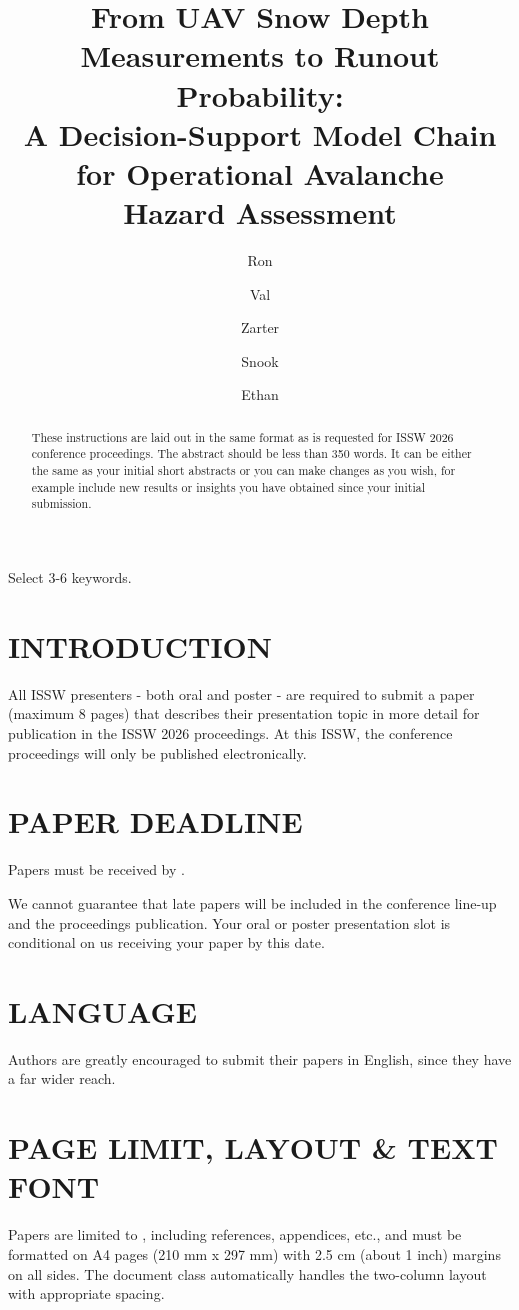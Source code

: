 \documentclass{issw}
\title{From UAV Snow Depth Measurements to Runout Probability: \\A Decision-Support Model Chain for Operational Avalanche \\Hazard Assessment}
\author[1]{Ron\corref{complete\_address}}
\author[1]{Val}
\author[1]{Zarter}
\author[1]{Snook}
\author[1]{Ethan}
\begin{document}
\begin{abstract}
These instructions are laid out in the same format as is requested for ISSW 2026 conference proceedings. The abstract should be less than 350 words. It can be either the same as your initial short abstracts or you can make changes as you wish, for example include new results or insights you have obtained since your initial submission.
\end{abstract}

\begin{keyword}
Select 3-6 keywords.
\end{keyword}

\maketitle


\section{INTRODUCTION}
All ISSW presenters - both oral and poster - are required to submit a paper (maximum 8 pages) that describes their presentation topic in more detail for publication in the ISSW 2026 proceedings. At this ISSW, the conference proceedings will only be published electronically.

\section{PAPER DEADLINE}
Papers must be received by \textbf{}.

We cannot guarantee that late papers will be included in the conference line-up and the proceedings publication. Your oral or poster presentation slot is conditional on us receiving your paper by this date.

\section{LANGUAGE} 
Authors are greatly encouraged to submit their papers in English, since they have a far wider reach.

\section{PAGE LIMIT, LAYOUT \& TEXT FONT}
Papers are limited to \textbf{}, including references, appendices, etc., and must be formatted on A4 pages (210 mm x 297 mm) with 2.5 cm (about 1 inch) margins on all sides. The document class automatically handles the two-column layout with appropriate spacing.
\end{document}
